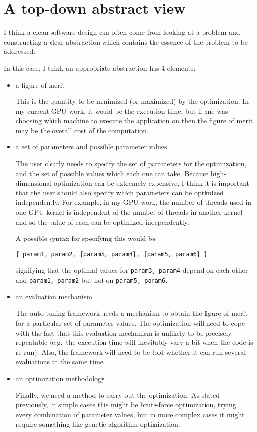 \documentclass[12pt]{article}
\begin{document}
\newpage

\section{A top-down abstract view}

I think a clean software design can often come from looking 
at a problem and constructing a clear abstraction which 
contains the essence of the problem to be addressed.

In this case, I think an appropriate abstraction 
has 4 elements:
\begin{itemize}
\item
a figure of merit

This is the quantity to be minimized (or maximized) by 
the optimization.  In my current GPU work, it would be 
the execution time, but if one was choosing which machine 
to execute the application on then the figure of merit 
may be the overall cost of the computation.


\item
a set of parameters and possible parameter values

The user clearly needs to specify the set of parameters
for the optimization, and the set of possible values which
each one can take.  Because high-dimensional optimization 
can be extremely expensive, I think it is important that 
the user should also specify which parameters can be 
optimized independently.  For example, in my GPU work, 
the number of threads used in one GPU kernel is independent
of the number of threads in another kernel and so the 
value of each can be optimized independently.

A possible syntax for specifying this would be:

{\tt \{ param1, param2, \{param3, param4\}, \{param5, param6\} \}}

signifying that the optimal values for {\tt param3, param4} 
depend on each other and {\tt param1, param2} but not on {\tt param5, param6}.

\item
an evaluation mechanism

The auto-tuning framework needs a mechanism to obtain the 
figure of merit for a particular set of parameter values.
The optimization will need to cope with the fact that this
evaluation mechanism is unlikely to be precisely repeatable
(e.g.~the execution time will inevitably vary a bit 
when the code is re-run).  Also, the framework will need to 
be told whether it can run several evaluations at the same time.

\item
an optimization methodology

Finally, we need a method to carry out the optimization.
As stated previously, in simple cases this might be brute-force 
optimization, trying every combination of parameter values,
but in more complex cases it might require something like
genetic algorithm optimization.

\end{itemize}
\end{document}
